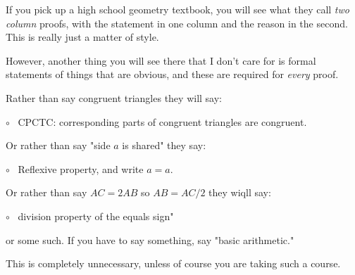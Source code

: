 \documentclass[11pt, oneside]{article}
\begin{document}
If you pick up a high school geometry textbook, you will see what they call \emph{two column} proofs, with the statement in one column and the reason in the second.  This is really just a matter of style.  

However, another thing you will see there that I don't care for is formal statements of things that are obvious, and these are required for \emph{every} proof.

Rather than say congruent triangles they will say:

$\circ$ \ CPCTC: corresponding parts of congruent triangles are congruent.

Or rather than say "side $a$ is shared" they say:

$\circ$ \ Reflexive property, and write $a = a$.

Or rather than say $AC = 2 AB$ so $AB = AC/2$ they wiqll say:

$\circ$ \ division property of the equals sign"

or some such.  If you have to say something, say "basic arithmetic."

This is completely unnecessary, unless of course you are taking such a course.
\end{document}
